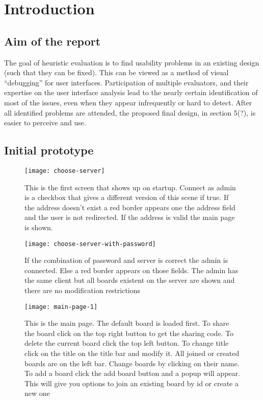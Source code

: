 \section{Introduction}

\subsection{Aim of the report}

The goal of heuristic evaluation is to find usability problems in an existing design (such that they can be fixed). This can be viewed as a method of visual “debugging” for user interfaces\cite{nielsen92}. Participation of multiple evaluators, and their expertise on the user interface analysis lead to the nearly certain identification of most of the issues, even when they appear infrequently or hard to detect. After all identified problems are attended, the proposed final design, in section 5(?), is easier to perceive and use.

\subsection {Initial prototype}

\begin{figure}[H]
\caption{This is the first screen that shows up on startup. Connect as admin is a checkbox that gives a different version of this scene if true. If the address doesn’t exist a red border appears one the address field and the user is not redirected. If the address is valid the main page is shown.}
\centering
\texttt{[image: choose-server]}
\end{figure}

\begin{figure}[H]
\caption{If the combination of password and server is correct the admin is connected. Else a red border appears on those fields. The admin has the same client but all boards existent on the server are shown and there are no modification restrictions}
\centering
\texttt{[image: choose-server-with-password]}
\end{figure}

\begin{figure}[H]
\caption{This is the main page. The default board is loaded first. To share the board click on the top right button to get the sharing code. To delete the current board click the top left button. To change title click on the title on the title bar and modify it. All joined or created boards are on the left bar. Change boards by clicking on their name. To add a board click the add board button and a popup will appear. This will give you options to join an existing board by id or create a new one}
\centering
\texttt{[image: main-page-1]}
\end{figure}

